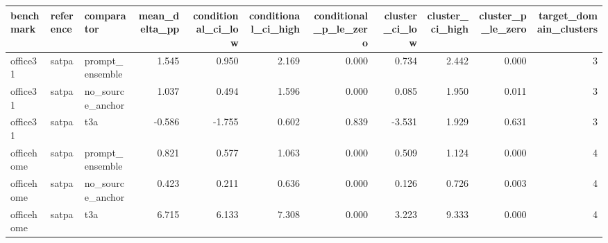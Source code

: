 \begin{tabular}{lllrrrrrrrr}
\toprule
benchmark & reference & comparator & mean\_delta\_pp & conditional\_ci\_low & conditional\_ci\_high & conditional\_p\_le\_zero & cluster\_ci\_low & cluster\_ci\_high & cluster\_p\_le\_zero & target\_domain\_clusters \\
\midrule
office31 & satpa & prompt\_ensemble & 1.545 & 0.950 & 2.169 & 0.000 & 0.734 & 2.442 & 0.000 & 3 \\
office31 & satpa & no\_source\_anchor & 1.037 & 0.494 & 1.596 & 0.000 & 0.085 & 1.950 & 0.011 & 3 \\
office31 & satpa & t3a & -0.586 & -1.755 & 0.602 & 0.839 & -3.531 & 1.929 & 0.631 & 3 \\
officehome & satpa & prompt\_ensemble & 0.821 & 0.577 & 1.063 & 0.000 & 0.509 & 1.124 & 0.000 & 4 \\
officehome & satpa & no\_source\_anchor & 0.423 & 0.211 & 0.636 & 0.000 & 0.126 & 0.726 & 0.003 & 4 \\
officehome & satpa & t3a & 6.715 & 6.133 & 7.308 & 0.000 & 3.223 & 9.333 & 0.000 & 4 \\
\bottomrule
\end{tabular}
